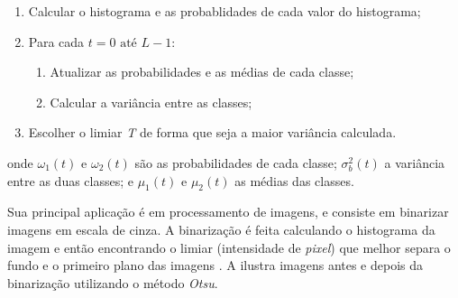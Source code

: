 \begin{enumerate}
    \item Calcular o histograma e as probablidades de cada valor do histograma;
    \item 
        Para cada $t = 0 \text{ até } L-1$:
        \begin{enumerate}
            \item Atualizar as probabilidades e as médias de cada classe;
            \item Calcular a variância entre as classes;
        \end{enumerate}
    \item Escolher o limiar \textit{T} de forma que seja a maior variância calculada.
\end{enumerate}






\noindent onde $\omega_{1}(t)$ e $\omega_{2}(t)$ são as probabilidades de cada classe; $\sigma_{b}^{2}(t)$ a variância entre as duas classes; e $\mu_{1}(t)$ e $\mu_{2}(t)$ as médias das classes.

\par Sua principal aplicação é em processamento de imagens, e consiste em binarizar imagens em escala de cinza. A binarização é feita calculando o histograma da imagem e então encontrando o limiar (intensidade de \textit{pixel}) que melhor separa o fundo e o primeiro plano das imagens \cite{gonsalez2006}. A  ilustra imagens antes e depois da binarização utilizando o método \textit{Otsu}.




